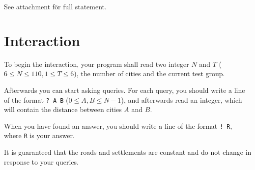 See attachment för full statement. \\
\section*{Interaction}
To begin the interaction, your program shall read two integer $N$ and $T$
($6 \leq N \leq 110, 1 \leq T \leq 6$), the number of cities and the current test group.

Afterwards you can start asking queries. 
For each query, you should write a line of the format \texttt{? A B} ($0 \le A, B \le N-1$),
and afterwards read an integer, which will contain the distance between cities $A$ and $B$.

When you have found an answer, you should write a line of the format \texttt{! R}, where \texttt{R}
is your answer.

It is guaranteed that the roads and settlements are constant and do not change in response to your queries.
